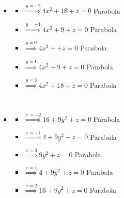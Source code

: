 \documentclass[../practica_02.tex]{subfiles}
\begin{document}
\begin{enumerate}
\begin{enumerate}
\begin{itemize}
                            $ $

                        \item
                            \begin{itemize}
                                \item $\stackrel{y=-2}{\Rightarrow} 4x^2 + 18 + z = 0 $ Parabola
                                \item $\stackrel{y=-1}{\Rightarrow} 4x^2 + 9  + z = 0 $ Parabola
                                \item $\stackrel{y=0}{\Rightarrow}  4x^2 +    + z = 0 $ Parabola
                                \item $\stackrel{y=1}{\Rightarrow}  4x^2 + 9  + z = 0 $ Parabola
                                \item $\stackrel{y=2}{\Rightarrow}  4x^2 + 18 + z = 0 $ Parabola
                            \end{itemize}

                            $ $

                        \item
                            \begin{itemize}
                                \item $\stackrel{x=-2}{\Rightarrow} 16 + 9y^2 + z = 0 $ Parabola
                                \item $\stackrel{x=-1}{\Rightarrow}  4 + 9y^2 + z = 0 $ Parabola
                                \item $\stackrel{x=0}{\Rightarrow}       9y^2 + z = 0 $ Parabola
                                \item $\stackrel{x=1}{\Rightarrow}   4 + 9y^2 + z = 0 $ Parabola
                                \item $\stackrel{x=2}{\Rightarrow}  16 + 9y^2 + z = 0 $ Parabola
                            \end{itemize}

                    \end{itemize}


\end{enumerate}
\end{enumerate}
\end{document}

